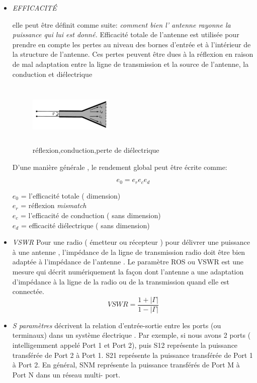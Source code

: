 \documentclass[11pt, a4paper, twoside]{book}
\begin{document}
\begin{itemize}
\item \emph{EFFICACITÉ}

elle peut être définit comme suite: \emph{comment bien l' antenne rayonne la puissance qui lui est donné.} Efficacité totale de l'antenne est utilisée pour prendre en compte les pertes au niveau des bornes d'entrée et à l'intérieur de la structure de l'antenne. Ces pertes peuvent être dues  à la réflexion en raison de mal adaptation entre la ligne de transmission et la source de l'antenne, la conduction et diélectrique

\begin{figure}[H]
\centering
\includegraphics[width=4cm,height=3cm]{wellwellwell}
\caption{réflexion,conduction,perte de diélectrique}
\end{figure}
D'une manière générale , le rendement global peut être écrite comme:

\begin{equation}
e_{0}=e_{r}e_{c}e_{d}
\end{equation}

\(e_{0}\) = l'efficacité totale ( dimension)\\
\(e_{r}\) = réflexion \emph{ mismatch} \\
\(e_{c}\) = l'efficacité de conduction ( sans dimension)\\
\(e_{d}\) = efficacité diélectrique ( sans dimension)\\

\item \emph{VSWR} 
Pour une radio ( émetteur ou récepteur ) pour délivrer une puissance à une antenne , l'impédance de la ligne de transmission radio doit être bien adaptée à l'impédance de l'antenne . Le paramètre ROS ou VSWR est une mesure qui décrit numériquement la façon dont l'antenne a une adaptation d'impédance à la ligne de la radio ou de la transmission quand elle est connectée.
\begin{equation}
VSWR = \dfrac{1+ |\Gamma|}{1-|\Gamma|}
\end{equation}

\item \emph{S paramètres}
décrivent la relation d'entrée-sortie entre les ports (ou terminaux) dans un système électrique . Par exemple, si nous avons 2 ports ( intelligemment appelé Port 1 et Port 2), puis S12 représente la puissance transférée de Port 2 à Port 1. S21 représente la puissance transférée de Port 1 à Port 2. En général, SNM représente la puissance transférés de Port M à Port N dans un réseau multi- port.
\end{itemize}
\end{document}
